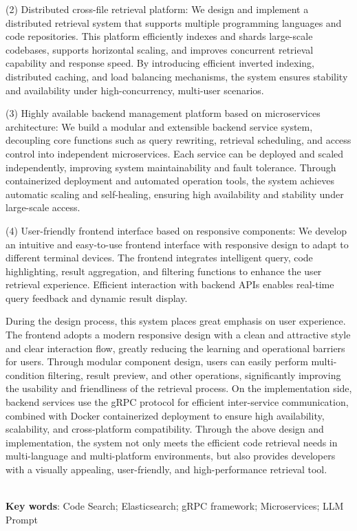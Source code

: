 \documentclass[UTF8,a4paper,12pt]{ctexart}
\numberwithin{equation}{section}
\begin{document}
(2) Distributed cross-file retrieval platform: We design and implement a distributed retrieval system that supports multiple programming languages and code repositories. This platform efficiently indexes and shards large-scale codebases, supports horizontal scaling, and improves concurrent retrieval capability and response speed. By introducing efficient inverted indexing, distributed caching, and load balancing mechanisms, the system ensures stability and availability under high-concurrency, multi-user scenarios.\par

(3) Highly available backend management platform based on microservices architecture: We build a modular and extensible backend service system, decoupling core functions such as query rewriting, retrieval scheduling, and access control into independent microservices. Each service can be deployed and scaled independently, improving system maintainability and fault tolerance. Through containerized deployment and automated operation tools, the system achieves automatic scaling and self-healing, ensuring high availability and stability under large-scale access.\par

(4) User-friendly frontend interface based on responsive components: We develop an intuitive and easy-to-use frontend interface with responsive design to adapt to different terminal devices. The frontend integrates intelligent query, code highlighting, result aggregation, and filtering functions to enhance the user retrieval experience. Efficient interaction with backend APIs enables real-time query feedback and dynamic result display.\par

During the design process, this system places great emphasis on user experience. The frontend adopts a modern responsive design with a clean and attractive style and clear interaction flow, greatly reducing the learning and operational barriers for users. Through modular component design, users can easily perform multi-condition filtering, result preview, and other operations, significantly improving the usability and friendliness of the retrieval process. On the implementation side, backend services use the gRPC protocol for efficient inter-service communication, combined with Docker containerized deployment to ensure high availability, scalability, and cross-platform compatibility. Through the above design and implementation, the system not only meets the efficient code retrieval needs in multi-language and multi-platform environments, but also provides developers with a visually appealing, user-friendly, and high-performance retrieval tool.\par
~\\ 
\hspace*{2em}\textbf{Key words}: Code Search; Elasticsearch; gRPC framework; Microservices; LLM Prompt\\
\end{document}

